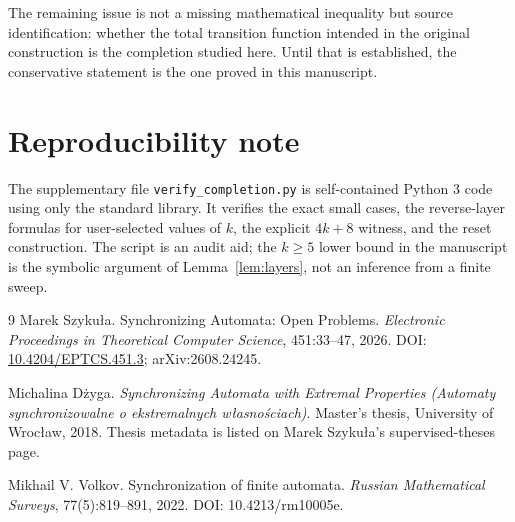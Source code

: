 \documentclass[11pt]{article}
\theoremstyle{definition}
\theoremstyle{remark}
\begin{document}
The remaining issue is not a missing mathematical inequality but source identification: whether the total transition function intended in the original construction is the completion studied here. Until that is established, the conservative statement is the one proved in this manuscript.

\section*{Reproducibility note}
The supplementary file \texttt{verify\_completion.py} is self-contained Python 3 code using only the standard library. It verifies the exact small cases, the reverse-layer formulas for user-selected values of $k$, the explicit $4k+8$ witness, and the reset construction. The script is an audit aid; the $k\ge5$ lower bound in the manuscript is the symbolic argument of Lemma~\ref{lem:layers}, not an inference from a finite sweep.

\begin{thebibliography}{9}
Marek Szyku\l a.
\newblock Synchronizing Automata: Open Problems.
\newblock \emph{Electronic Proceedings in Theoretical Computer Science}, 451:33--47, 2026.
\newblock DOI: \href{https://doi.org/10.4204/EPTCS.451.3}{10.4204/EPTCS.451.3}; arXiv:2608.24245.

Michalina D\.{z}yga.
\newblock \emph{Synchronizing Automata with Extremal Properties (Automaty synchronizowalne o ekstremalnych w\l asno\'sciach)}.
\newblock Master's thesis, University of Wroc\l aw, 2018.
\newblock Thesis metadata is listed on Marek Szyku\l a's supervised-theses page.

Mikhail V. Volkov.
\newblock Synchronization of finite automata.
\newblock \emph{Russian Mathematical Surveys}, 77(5):819--891, 2022.
\newblock DOI: 10.4213/rm10005e.
\end{thebibliography}
\end{document}

